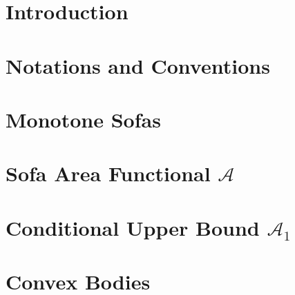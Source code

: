 \chapter{Introduction}
\label{sec:introduction}


\chapter{Notations and Conventions}
\label{sec:notations-and-conventions}


\chapter{Monotone Sofas}
\label{sec:monotone-sofas}


\chapter{Sofa Area Functional $\mathcal{A}$}
\label{sec:sofa-area-functional-a}


\chapter{Conditional Upper Bound $\mathcal{A}_1$}
\label{sec:conditional-upper-bound-a1}


\appendix
\chapter{Convex Bodies}
\label{sec:convex-bodies}


